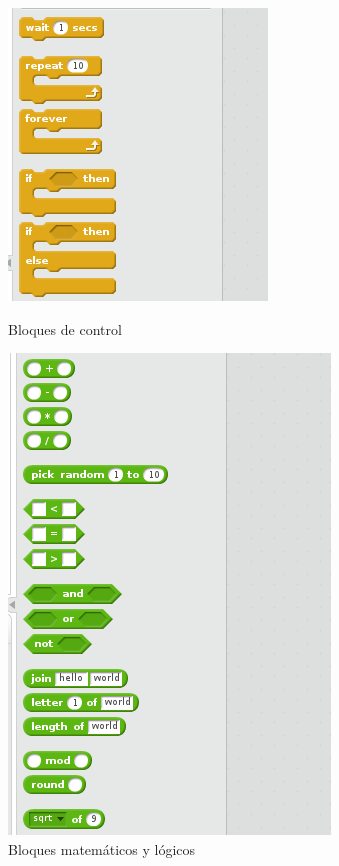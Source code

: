 \begin{figure}[H]
	\begin{minipage}{0.33\textwidth}
    	\centering
    	\includegraphics[scale=0.40]{img/bloques-control.png}
     	\caption{Bloques de control}
  		\label{fig:bloques-control}
   	\end{minipage}\hfill
   	\begin {minipage}{0.33\textwidth}
     	\centering
     	\includegraphics[scale=0.40]{img/bloques-mat.png}
  		\caption{Bloques matemáticos y lógicos}
  		\label{fig:bloques-mat}
	\end{minipage}
	\begin {minipage}{0.33\textwidth}

\end{minipage}
\end{figure}
